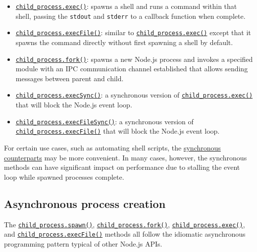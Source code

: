 \begin{itemize}
\tightlist
\item
  \hyperref[child_processexeccommand-options-callback]{\texttt{child\_process.exec()}}:
  spawns a shell and runs a command within that shell, passing the
  \texttt{stdout} and \texttt{stderr} to a callback function when
  complete.
\item
  \hyperref[child_processexecfilefile-args-options-callback]{\texttt{child\_process.execFile()}}:
  similar to
  \hyperref[child_processexeccommand-options-callback]{\texttt{child\_process.exec()}}
  except that it spawns the command directly without first spawning a
  shell by default.
\item
  \hyperref[child_processforkmodulepath-args-options]{\texttt{child\_process.fork()}}:
  spawns a new Node.js process and invokes a specified module with an
  IPC communication channel established that allows sending messages
  between parent and child.
\item
  \hyperref[child_processexecsynccommand-options]{\texttt{child\_process.execSync()}}:
  a synchronous version of
  \hyperref[child_processexeccommand-options-callback]{\texttt{child\_process.exec()}}
  that will block the Node.js event loop.
\item
  \hyperref[child_processexecfilesyncfile-args-options]{\texttt{child\_process.execFileSync()}}:
  a synchronous version of
  \hyperref[child_processexecfilefile-args-options-callback]{\texttt{child\_process.execFile()}}
  that will block the Node.js event loop.
\end{itemize}

For certain use cases, such as automating shell scripts, the
\hyperref[synchronous-process-creation]{synchronous counterparts} may be
more convenient. In many cases, however, the synchronous methods can
have significant impact on performance due to stalling the event loop
while spawned processes complete.

\subsection{Asynchronous process
creation}\label{asynchronous-process-creation}

The
\hyperref[child_processspawncommand-args-options]{\texttt{child\_process.spawn()}},
\hyperref[child_processforkmodulepath-args-options]{\texttt{child\_process.fork()}},
\hyperref[child_processexeccommand-options-callback]{\texttt{child\_process.exec()}},
and
\hyperref[child_processexecfilefile-args-options-callback]{\texttt{child\_process.execFile()}}
methods all follow the idiomatic asynchronous programming pattern
typical of other Node.js APIs.

